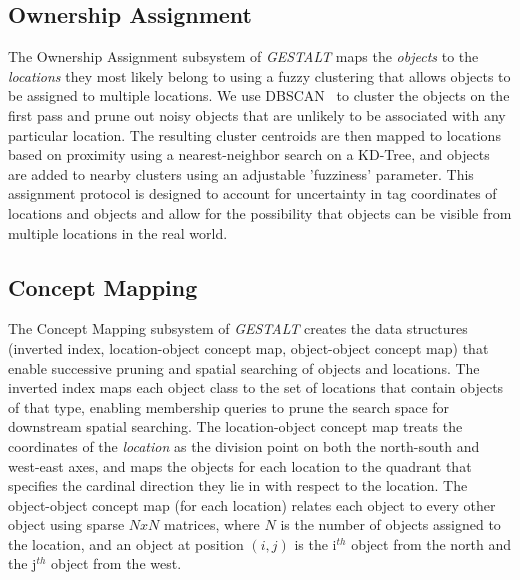\subsection{Ownership Assignment}
The Ownership Assignment subsystem of \emph{GESTALT} maps the \textit{objects} to the \textit{locations} they most likely belong to using a fuzzy clustering that allows objects to be assigned to multiple locations. 
We use DBSCAN~\cite{DBSCAN} to cluster the objects on the first pass and prune out noisy objects that are unlikely to be associated with any particular location. %
The resulting cluster centroids are then mapped to locations based on proximity using a nearest-neighbor search on a KD-Tree, and objects are added to nearby clusters using an adjustable 'fuzziness' parameter.
This assignment protocol is designed to account for uncertainty in tag coordinates of locations and objects and allow for the possibility that objects can be visible from multiple locations in the real world.


\subsection{Concept Mapping}
The Concept Mapping subsystem of \emph{GESTALT} creates the data structures (inverted index, location-object concept map, object-object concept map) that enable successive pruning and spatial searching of objects and locations. 
The inverted index maps each object class to the set of locations that contain objects of that type, enabling membership queries to prune the search space for downstream spatial searching. 
The location-object concept map treats the coordinates of the \textit{location} as the division point on both the north-south and west-east axes, and maps the objects for each location to the quadrant that specifies the cardinal direction they lie in with respect to the location.%
The object-object concept map (for each location) relates each object to every other object using sparse $NxN$ matrices, where $N$ is the number of objects assigned to the location, and an object at position $(i,j)$ is the i$^{th}$ object from the north and the j$^{th}$ object from the west. 

